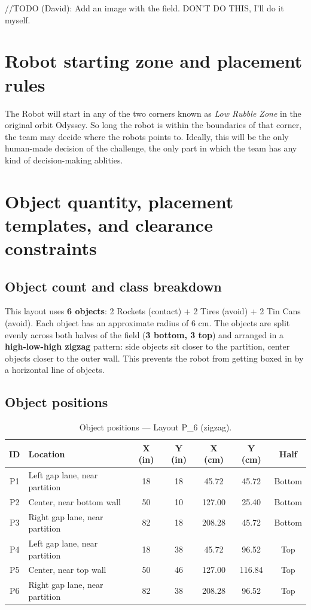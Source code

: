 \documentclass[a4]{article}
\begin{document}
//TODO (David): Add an image with the field. DON'T DO THIS, I'll do it myself.

\section*{Robot starting zone and placement rules}
The Robot will start in any of the two corners known as \textit{Low Rubble Zone} in the original orbit Odyssey. So long the robot is within the boundaries of that corner, the team may decide where the robots points to. Ideally, this will be the only human-made decision of the challenge, the only part in which the team has any kind of decision-making ablities. 

\section*{Object quantity, placement templates, and clearance constraints}
\subsection*{Object count and class breakdown}
This layout uses \textbf{6 objects}: 2 Rockets (contact) + 2 Tires (avoid) + 2 Tin Cans (avoid). Each object has an approximate radius of 6 cm. The objects are split evenly across both halves of the field (\textbf{3 bottom, 3 top}) and arranged in a \textbf{high-low-high zigzag} pattern: side objects sit closer to the partition, center objects closer to the outer wall. This prevents the robot from getting boxed in by a horizontal line of objects.

\subsection*{Object positions}

\begin{table}[H]
\centering
\begin{tabular}{clccccc}
\toprule
\textbf{ID} & \textbf{Location} & \textbf{X (in)} & \textbf{Y (in)} & \textbf{X (cm)} & \textbf{Y (cm)} & \textbf{Half} \\
\midrule
P1 & Left gap lane, near partition & 18 & 18 & 45.72 & 45.72 & Bottom \\
P2 & Center, near bottom wall & 50 & 10 & 127.00 & 25.40 & Bottom \\
P3 & Right gap lane, near partition & 82 & 18 & 208.28 & 45.72 & Bottom \\
P4 & Left gap lane, near partition & 18 & 38 & 45.72 & 96.52 & Top \\
P5 & Center, near top wall & 50 & 46 & 127.00 & 116.84 & Top \\
P6 & Right gap lane, near partition & 82 & 38 & 208.28 & 96.52 & Top \\
\bottomrule
\end{tabular}
\caption{Object positions --- Layout P\_6 (zigzag).}
\end{table}
\end{document}
